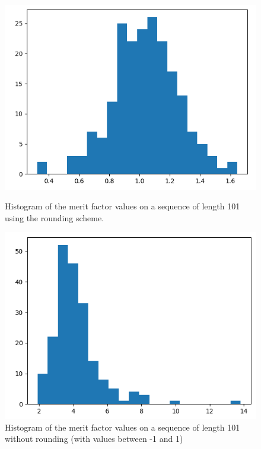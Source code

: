 \documentclass[a4paper,11pt,openany]{article}
\begin{document}
\begin{figure}[H]
\centering
\begin{minipage}{.45\textwidth}
  \begin{center}
  \includegraphics[scale=0.35]{Images/histo_linear_opti_rounded}
  \caption{Histogram of the merit factor values on a sequence of length 101 using the rounding scheme.}
  \label{fig:histo_linear_opti_rounded}
  \end{center}
\end{minipage}%
\hfill
\begin{minipage}{.45\textwidth}
  \begin{center}
  \includegraphics[scale=0.35]{Images/histo_linear_opti}
  \caption{Histogram of the merit factor values on a sequence of length 101 without rounding (with values between -1 and 1)}
  \label{fig:histo_linear_opti}
  \end{center}
\end{minipage}
\end{figure}
\end{document}
